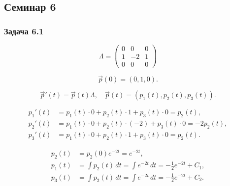 \subsection{Семинар 6}

\subsubsection*{Задача 6.1}


\[
	\Lambda =
	\begin{pmatrix}
		0 & 0  & 0 \\
		1 & -2 & 1 \\
		0 & 0  & 0
	\end{pmatrix}
\]

\[
	\vec{p}(0) = (0,1,0).
\]

\[
	\vec{p}'(t) = \vec{p}(t)\Lambda,\quad \vec{p}(t)=(p_1(t),p_2(t),p_3(t)).
\]

\[
	\begin{aligned}
		p_1'(t) & = p_1 (t)\cdot 0 + p_2(t)\cdot 1 + p_3(t)\cdot 0 = p_2(t),     \\
		p_2'(t) & = p_1 (t)\cdot 0 + p_2(t)\cdot(-2) + p_3(t)\cdot 0 = -2p_2(t), \\
		p_3'(t) & = p_1 (t)\cdot 0 + p_2(t)\cdot 1 + p_3(t)\cdot 0 = p_2(t).
	\end{aligned}
\]

\[
	\begin{aligned}
		p_2(t) & = p_2(0)e^{-2t} = e^{-2t},                                       \\
		p_1(t) & = \int p_2(t)\,dt = \int e^{-2t}\,dt = -\tfrac{1}{2}e^{-2t}+C_1, \\
		p_3(t) & = \int p_2(t)\,dt = \int e^{-2t}\,dt = -\tfrac{1}{2}e^{-2t}+C_2.
	\end{aligned}
\]

